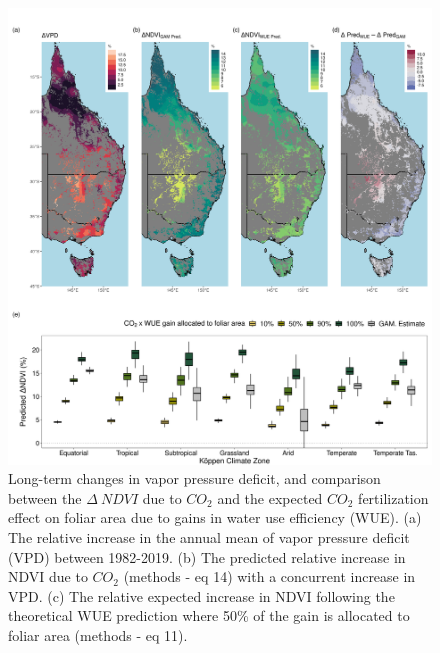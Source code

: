 \documentclass[gc, manuscript]{copernicus}
\begin{document}
\clearpage
\begin{figure}
\includegraphics[width=14cm]{../../figures/Fig7_map_dVpd_gamCO2Pred_wueCO2Pred_dDifferenceBoxplot} \caption{Long-term changes in vapor pressure deficit, and comparison between the $\Delta~NDVI$ due to $CO_2$ and the expected $CO_2$ fertilization effect on foliar area due to gains in water use efficiency (WUE). (a) The relative increase in the annual mean of vapor pressure deficit (VPD) between 1982-2019. (b) The predicted relative increase in NDVI due to $CO_2$ (methods - eq 14) with a concurrent increase in VPD. (c) The relative expected increase in NDVI following the theoretical WUE prediction where 50\% of the gain is allocated to foliar area (methods - eq 11).}\label{fig:unnamed-chunk-6}
\end{figure}
\clearpage
\end{document}

